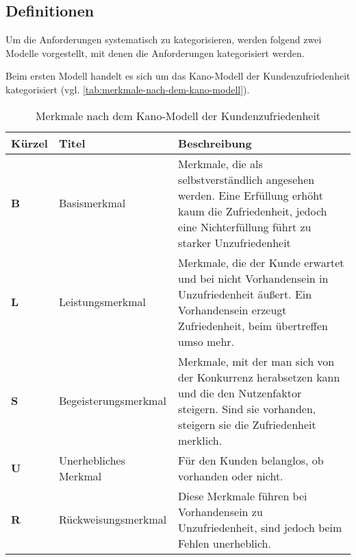 	
\subsection{Definitionen}
	
Um die Anforderungen systematisch zu kategorisieren, werden folgend zwei Modelle vorgestellt, mit denen die Anforderungen kategorisiert werden.

Beim ersten Modell handelt es sich um das Kano-Modell \cite{KanoModell} der Kundenzufriedenheit kategorisiert (vgl. \autoref{tab:merkmale-nach-dem-kano-modell}).
	
\begin{table}[H]
\begin{tabular}{ |p{1.15cm}|p{2.75cm}|p{9.6cm}| }
	\hline
	Kürzel & Titel & Beschreibung \\
	\hline
	\textbf{B} & Basis\-merkmal & Merkmale, die als selbstverständlich angesehen werden. Eine Erfüllung erhöht kaum die Zufriedenheit, jedoch eine Nichterfüllung führt zu starker Unzufriedenheit \\
	\hline
	\textbf{L} & Leistungs\-merkmal & Merkmale, die der Kunde erwartet und bei nicht Vorhandensein in Unzufriedenheit äußert. Ein Vorhandensein erzeugt Zufriedenheit, beim übertreffen umso mehr. \\
	\hline
	\textbf{S} & Begeisterungs\-merkmal & Merkmale, mit der man sich von der Konkurrenz herabsetzen kann und die den Nutzenfaktor steigern. Sind sie vorhanden, steigern sie die Zufriedenheit merklich. \\
	\hline
	\textbf{U} & Unerhebliches Merkmal & Für den Kunden belanglos, ob vorhanden oder nicht. \\
	\hline
	\textbf{R} & Rückweisungs\-merkmal & Diese Merkmale führen bei Vorhandensein zu Unzufriedenheit, sind jedoch beim Fehlen unerheblich. \\
	\hline
\end{tabular}
 \captionsetup{justification=centering}
  \caption{Merkmale nach dem Kano-Modell der Kundenzufriedenheit}
   \label{tab:merkmale-nach-dem-kano-modell}
\end{table}

